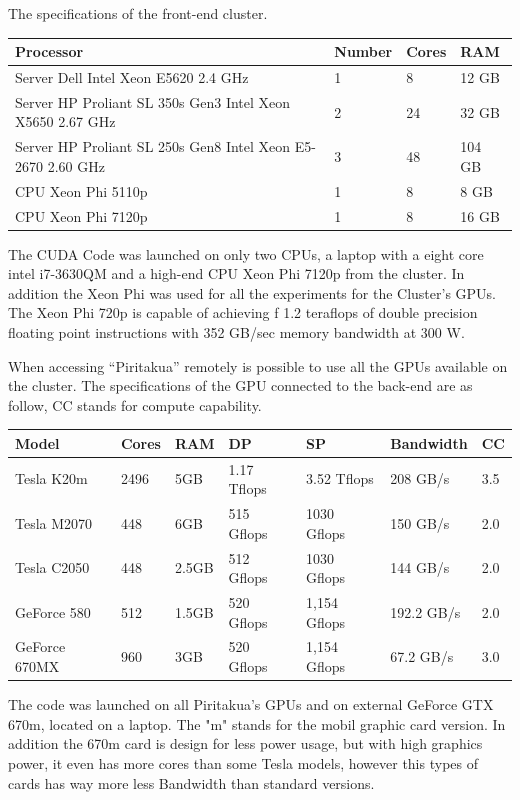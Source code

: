 The specifications of the front-end cluster.

\begin{tabular}{ | p{7.1cm}  | l | l | l |}
  \hline
  Processor & Number & Cores & RAM  \\
  \hline
  Server Dell Intel Xeon E5620 2.4 GHz & 1 & 8 & 12 GB \\
  \hline
  Server HP Proliant SL 350s Gen3 Intel Xeon X5650 2.67 GHz & 2 & 24 & 32 GB \\
  \hline
   Server HP Proliant SL 250s Gen8 Intel Xeon E5-2670 2.60 GHz & 3 & 48 &104 GB \\
   \hline
   CPU Xeon Phi  5110p & 1 & 8 & 8 GB\\
   \hline
   CPU Xeon Phi 7120p  & 1 & 8 & 16 GB\\
   \hline
  \end{tabular}

 The CUDA Code was launched on only two CPUs, a laptop with a eight core intel i7-3630QM and a high-end CPU Xeon Phi 7120p from the cluster. In addition the Xeon Phi was used for all the experiments for the Cluster's GPUs. The Xeon Phi 720p is capable of achieving f 1.2 teraflops of double precision floating point instructions with 352 GB/sec memory bandwidth at 300 W.

When accessing ``Piritakua'' remotely is possible to use all the GPUs available on the cluster.
 The specifications of the GPU connected to the back-end are as follow, CC stands for compute capability.

  \begin{tabular}{ |  l  |  l  |  l  |  l  |  l  | l | l |}
    \hline
    Model & Cores & RAM & DP & SP & Bandwidth & CC \\
    \hline
    Tesla K20m & 2496 & 5GB & 1.17 Tflops & 3.52 Tflops & 208 GB/s & 3.5 \\
   \hline
    Tesla M2070 & 448 & 6GB & 515 Gflops & 1030 Gflops & 150 GB/s & 2.0 \\
   \hline
     Tesla C2050 & 448 & 2.5GB & 512 Gflops & 1030 Gflops & 144 GB/s & 2.0  \\
   \hline
      GeForce 580 & 512 & 1.5GB & 520 Gflops & 1,154 Gflops & 192.2 GB/s & 2.0  \\
   \hline
   GeForce 670MX & 960 & 3GB & 520 Gflops & 1,154 Gflops & 67.2 GB/s & 3.0  \\
   \hline
  \end{tabular}

   The code was launched on all Piritakua's GPUs and on external GeForce GTX 670m, located on a laptop. The "m" stands for the mobil graphic card version. In addition the 670m card is design for less power usage, but with high graphics power, it even has more cores than some Tesla models, however this types of cards has way more less Bandwidth than standard versions.

